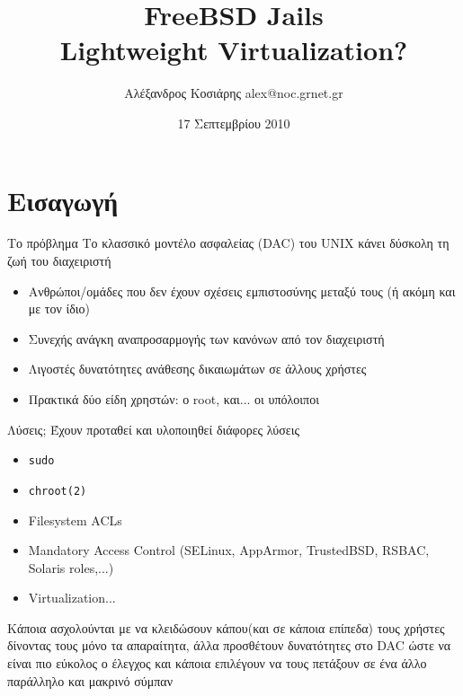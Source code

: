 \documentclass{beamer}
\title[FreeBSD Jails]{FreeBSD Jails \\ Lightweight Virtualization?}
\author{Αλέξανδρος Κοσιάρης alex@noc.grnet.gr}
\institute{Πανεπιστήμιο Πειραιά - Software Libre Society}
\date{17 Σεπτεμβρίου 2010}
\begin{document}

\begin{frame}
    \titlepage
\end{frame}

\section{Εισαγωγή}

    \begin{frame}{Το πρόβλημα}
        Το κλασσικό μοντέλο ασφαλείας (DAC) του UNIX κάνει δύσκολη τη ζωή του διαχειριστή

        \begin{itemize}
            \pause \item Ανθρώποι/ομάδες που δεν έχουν σχέσεις εμπιστοσύνης μεταξύ τους (ή ακόμη και με τον ίδιο)
            \pause \item Συνεχής ανάγκη αναπροσαρμογής των κανόνων από τον διαχειριστή
            \pause \item Λιγοστές δυνατότητες ανάθεσης δικαιωμάτων σε άλλους χρήστες
            \pause \item Πρακτικά δύο είδη χρηστών: ο root, και... οι υπόλοιποι
        \end{itemize}

    \end{frame}

    \begin{frame}{Λύσεις;}
        Έχουν προταθεί και υλοποιηθεί διάφορες λύσεις

        \begin{itemize}
            \item \texttt{sudo}
            \item \texttt{chroot(2)}
            \item Filesystem ACLs
            \item Mandatory Access Control (SELinux, AppArmor, TrustedBSD, RSBAC, Solaris roles,...)
            \item Virtualization...
        \end{itemize}

        \pause Κάποια ασχολούνται με να κλειδώσουν κάπου(και σε κάποια επίπεδα) τους χρήστες δίνοντας τους μόνο τα απαραίτητα, άλλα προσθέτουν δυνατότητες στο DAC ώστε να είναι πιο εύκολος ο έλεγχος και κάποια επιλέγουν να τους πετάξουν σε ένα άλλο παράλληλο και μακρινό σύμπαν

    \end{frame}
\end{document}
